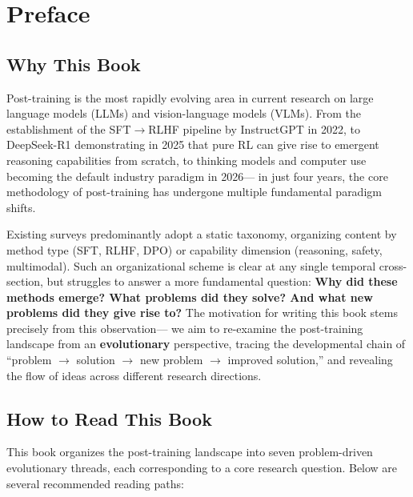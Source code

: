 \section*{Preface}

\subsection*{Why This Book}

Post-training is the most rapidly evolving area in current research on large language models (LLMs) and vision-language models (VLMs).
From the establishment of the SFT$\rightarrow$RLHF pipeline by InstructGPT in 2022,
to DeepSeek-R1 demonstrating in 2025 that pure RL can give rise to emergent reasoning capabilities from scratch,
to thinking models and computer use becoming the default industry paradigm in 2026---
in just four years, the core methodology of post-training has undergone multiple fundamental paradigm shifts.

Existing surveys predominantly adopt a static taxonomy, organizing content by method type (SFT, RLHF, DPO) or capability dimension (reasoning, safety, multimodal).
Such an organizational scheme is clear at any single temporal cross-section, but struggles to answer a more fundamental question:
\textbf{Why did these methods emerge? What problems did they solve? And what new problems did they give rise to?}
The motivation for writing this book stems precisely from this observation---
we aim to re-examine the post-training landscape from an \textbf{evolutionary} perspective,
tracing the developmental chain of ``problem $\rightarrow$ solution $\rightarrow$ new problem $\rightarrow$ improved solution,''
and revealing the flow of ideas across different research directions.

\subsection*{How to Read This Book}

This book organizes the post-training landscape into seven problem-driven evolutionary threads,
each corresponding to a core research question. Below are several recommended reading paths:

